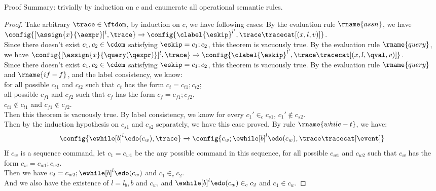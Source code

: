 	Proof Summary: trivially by induction on $c$ and enumerate all operational semantic rules.
\begin{proof}
	Take arbitrary $\trace \in \ftdom$, by induction on $c$, we have following cases:
		By the evaluation rule $\rname{assn}$, we have
		$
		{
		\config{[\assign{{x}}{\aexpr}]^{l},  \trace } 
		\xrightarrow{} 
		\config{\clabel{\eskip}^{l'}, \trace \tracecat [({x}, l, v) ]}
		}$.
		\\
		Since there doesn't exist $c_1, c_2 \in \cdom$ satisfying $\eskip = c_1; c_2$, this theorem is vacuously true.
		By the evaluation rule $\rname{query}$, we have
		$
		{
		\config{[\assign{{x}}{\query(\qexpr)}]^{l},  \trace } 
		\xrightarrow{} 
		\config{\clabel{\eskip}^{l'}, \trace \tracecat [({x}, l, \qval, v) ]}
		}$.
		\\
		Since there doesn't exist $c_1, c_2 \in \cdom$ satisfying $\eskip = c_1; c_2$, this theorem is vacuously true.
		By the evaluation rule $\rname{query}$ and $\rname{if-f}$, and the label consistency, we know:
		\\
		for all possible $c_{t1}$ and $c_{t2}$ 
		such that $c_t$ has the form $c_t = c_{t1};c_{t2}$;
		\\
		all possible $c_{f1}$ and $c_{f2}$ 
		such that $c_f$ has the form $c_f = c_{f1};c_{f2}$,
		\\
		$c_{t1} \notin c_{t1}$ and $c_{f1} \notin c_{f2}$.
		\\
		Then this theorem is vacuously true.
		By label consistency, we know for every $c_1' \in_c c_{s1}$, $c_1' \notin c_{s2}$.
		\\
		Then by the induction hypothesis on $c_{s1}$ and $c_{s2}$ separately, we have this case proved.
		By rule $\rname{while-t}$, we have:
		\[
			\config{{\ewhile [b]^{l} \edo (c_w), \trace}}
			\xrightarrow{} 
			\config{{
			c_w; \ewhile [b]^{l} \edo (c_w),
			\trace \tracecat [\event]}}
		\]
		If $c_w$ is a sequence command,
		let $c_1 = c_{w1}$ be the any possible command in this sequence, for all possible $c_{w1}$ and $c_{w2}$ 
		such that $c_w$ has the form $c_w = c_{w1};c_{w2}$.
		\\
		Then we have $c_2 = c_{w2};\ewhile [b]^{l} \edo (c_w)$ and $c_1 \in_c c_2$.
		\\
		And we also have the existence of $l = l_b, b$ and $c_w$, and $\ewhile [b]^{l} \edo (c_w) \in_c c_2$ and  $c_1 \in c_w$.

\end{proof}
